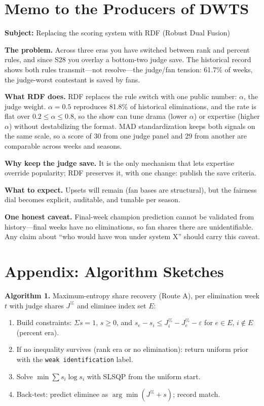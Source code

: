 \documentclass[12pt]{article}
\begin{document}
\section*{Memo to the Producers of DWTS}
\textbf{Subject:} Replacing the scoring system with RDF (Robust Dual Fusion)

\textbf{The problem.} Across three eras you have switched between rank and percent
rules, and since S28 you overlay a bottom-two judge save. The historical record
shows both rules transmit---not resolve---the judge/fan tension: 61.7\% of weeks,
the judge-worst contestant is saved by fans.

\textbf{What RDF does.} RDF replaces the rule switch with one public number:
$\alpha$, the judge weight. $\alpha{=}0.5$ reproduces 81.8\% of historical
eliminations, and the rate is flat over $0.2 \le \alpha \le 0.8$, so the show can
tune drama (lower $\alpha$) or expertise (higher $\alpha$) without destabilizing
the format. MAD standardization keeps both signals on the same scale, so a score
of 30 from one judge panel and 29 from another are comparable across weeks and
seasons.

\textbf{Why keep the judge save.} It is the only mechanism that lets expertise
override popularity; RDF preserves it, with one change: publish the save criteria.

\textbf{What to expect.} Upsets will remain (fan bases are structural), but the
fairness dial becomes explicit, auditable, and tunable per season.

\textbf{One honest caveat.} Final-week champion prediction cannot be validated from
history---final weeks have no eliminations, so fan shares there are unidentifiable.
Any claim about ``who would have won under system X'' should carry this caveat.

\section*{Appendix: Algorithm Sketches}

\noindent\textbf{Algorithm 1.} Maximum-entropy share recovery (Route A), per
elimination week $t$ with judge shares $J^\%$ and eliminee index set $E$:
\begin{enumerate}
\item Build constraints: $\Sigma s = 1$, $s \ge 0$, and
$s_e - s_i \le J^\%_i - J^\%_e - \varepsilon$ for $e \in E$, $i \notin E$
(percent era).
\item If no inequality survives (rank era or no elimination): return uniform
prior with the \texttt{weak identification} label.
\item Solve $\min \sum s_i \log s_i$ with SLSQP from the uniform start.
\item Back-test: predict eliminee as $\arg\min (J^\% + s)$; record match.
\end{enumerate}
\end{document}
